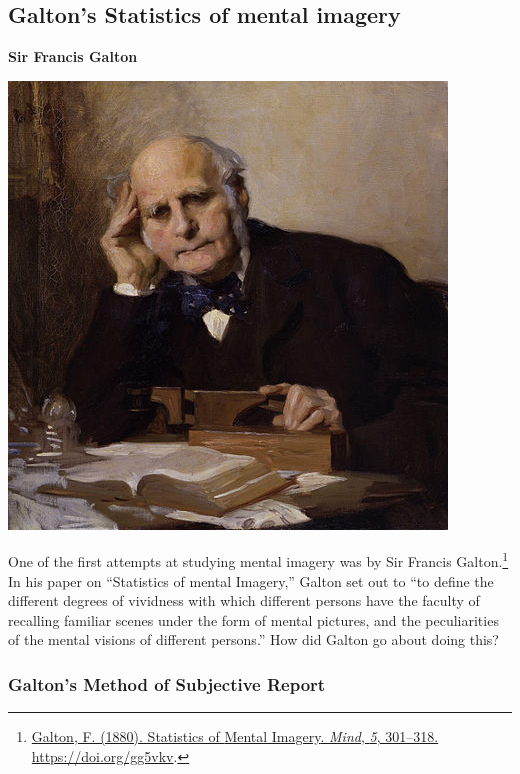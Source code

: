 \documentclass[
  oneside,
  12pt]{crumpbook}
\newenvironment{floatrightbox25}{%
  \wrapfigure{R}{.25\textwidth}%
  }{%
  \endwrapfigure}
\begin{document}
\hypertarget{galtons-statistics-of-mental-imagery}{%
\subsection{Galton's Statistics of mental imagery}\label{galtons-statistics-of-mental-imagery}}

\begin{floatrightbox25}
\textbf{Sir Francis Galton}

\includegraphics[width=1\linewidth]{imgs/Francis_Galton}

\end{floatrightbox25}

One of the first attempts at studying mental imagery was by Sir Francis Galton.\footnote{\protect\hyperlink{ref-galtonStatisticsMentalImagery1880}{Galton, F. (1880). Statistics of {Mental Imagery}. \emph{Mind}, \emph{5}, 301--318. \url{https://doi.org/gg5vkv}}.} In his paper on ``Statistics of mental Imagery,'' Galton set out to ``to define the different degrees of vividness with which different persons have the faculty of recalling familiar scenes under the form of mental pictures, and the peculiarities of the mental visions of different persons.'' How did Galton go about doing this?

\hypertarget{galtons-method-of-subjective-report}{%
\subsubsection{Galton's Method of Subjective Report}\label{galtons-method-of-subjective-report}}
\end{document}
